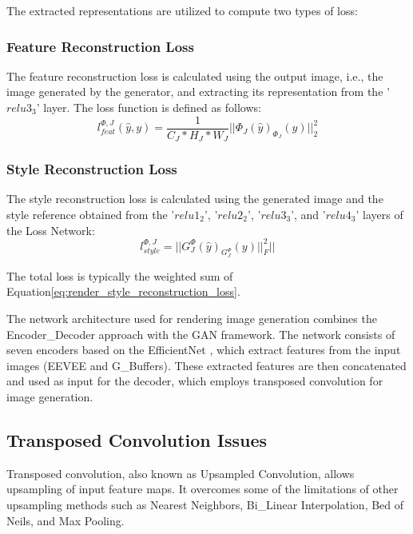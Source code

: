 The extracted representations are utilized to compute two types of loss:

\subsubsection{Feature Reconstruction Loss}
The feature reconstruction loss is calculated using the output image, i.e., the image generated by the generator, and extracting its representation from the '\textit{$relu3_3$}' layer. The loss function is defined as follows:
\begin{equation}
l_{feat}^{\Phi,J} (\hat{y}, y) = \frac{1}{C_J * H_J * W_J} ||\Phi_J(\hat{y}) _ \Phi_J(y)||_2^2
\label{eq:render_feature_reconstruction_loss}
\end{equation}

\subsubsection{Style Reconstruction Loss}
The style reconstruction loss is calculated using the generated image and the style reference obtained from the '\textit{$relu1_2$}', '\textit{$relu2_2$}', '\textit{$relu3_3$}', and '\textit{$relu4_3$}' layers of the Loss Network:
\begin{equation}
l_{style}^{\Phi,J} = || G_J^{\Phi} (\hat{y}) _ G_J^{\Phi}(y)||_F^2 ||
\label{eq:render_style_reconstruction_loss}
\end{equation}

The total loss is typically the weighted sum of Equation\ref{eq:render_style_reconstruction_loss}.

The network architecture used for rendering image generation combines the Encoder_Decoder approach with the GAN framework. The network consists of seven encoders based on the EfficientNet \cite{tan2019efficientnet}, which extract features from the input images (EEVEE and G_Buffers). These extracted features are then concatenated and used as input for the decoder, which employs transposed convolution for image generation.

\subsection{Transposed Convolution Issues}
Transposed convolution, also known as Upsampled Convolution, allows upsampling of input feature maps. It overcomes some of the limitations of other upsampling methods such as Nearest Neighbors, Bi_Linear Interpolation, Bed of Neils, and Max Pooling.

